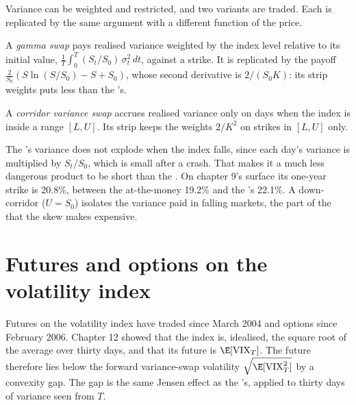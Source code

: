 Variance can be weighted and restricted, and two variants are traded. Each is replicated by the same argument
with a different function of the price.

\begin{definition}\label{def:dv:variance-swaps-and-volatility-derivatives:gamma}
A \emph{gamma swap} pays realised variance weighted by the index level relative to its initial
value, $\frac1T\int_0^T(S_t/S_0)\,\sigma_t^2\,dt$, against a strike. It is replicated by the payoff
$\frac2{S_0}(S\ln(S/S_0)-S+S_0)$, whose second derivative is $2/(S_0K)$: its strip weights puts less than the
's.
\end{definition}

\begin{definition}\label{def:dv:variance-swaps-and-volatility-derivatives:corridor}
A \emph{corridor variance swap} accrues realised variance only on days when the
index is inside a range $[L,U]$. Its strip keeps the weights $2/K^2$ on strikes in $[L,U]$ only.
\end{definition}

The 's variance does not explode when the index falls, since each day's variance is multiplied by
$S_t/S_0$, which is small after a crash. That makes it a much less dangerous product to be short than the . On
chapter 9's surface its one-year strike is 20.8\%, between the at-the-money 19.2\% and the 's
22.1\%. A down-corridor ($U=S_0$) isolates the variance paid in falling markets, the part of the 
that the skew makes expensive.

\section{Futures and options on the volatility index}

Futures on the volatility index have traded since March 2004 and options since February 2006. Chapter 12 showed
that the index is, idealised, the square root of the average  over thirty days, and that its
future is $\E[\mathrm{VIX}_T]$. The future therefore lies below the forward variance-swap volatility
$\sqrt{\E[\mathrm{VIX}_T^2]}$ by a convexity gap. The gap is the same Jensen effect as the 's,
applied to thirty days of variance seen from $T$.


